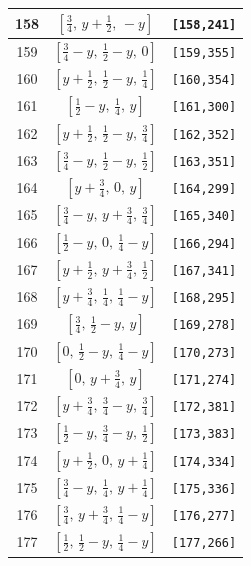 \documentclass[fleqn,8pt]{jsarticle}
\begin{document}
\begin{longtable}{ccc}
158 & $\left[ \frac{3}{4},\, y + \frac{1}{2},\, - y \right]$ & {\tt [158,241]} \\ \hline
159 & $\left[ \frac{3}{4} - y,\, \frac{1}{2} - y,\, 0 \right]$ & {\tt [159,355]} \\ \hline
160 & $\left[ y + \frac{1}{2},\, \frac{1}{2} - y,\, \frac{1}{4} \right]$ & {\tt [160,354]} \\ \hline
161 & $\left[ \frac{1}{2} - y,\, \frac{1}{4},\, y \right]$ & {\tt [161,300]} \\ \hline
162 & $\left[ y + \frac{1}{2},\, \frac{1}{2} - y,\, \frac{3}{4} \right]$ & {\tt [162,352]} \\ \hline
163 & $\left[ \frac{3}{4} - y,\, \frac{1}{2} - y,\, \frac{1}{2} \right]$ & {\tt [163,351]} \\ \hline
164 & $\left[ y + \frac{3}{4},\, 0,\, y \right]$ & {\tt [164,299]} \\ \hline
165 & $\left[ \frac{3}{4} - y,\, y + \frac{3}{4},\, \frac{3}{4} \right]$ & {\tt [165,340]} \\ \hline
166 & $\left[ \frac{1}{2} - y,\, 0,\, \frac{1}{4} - y \right]$ & {\tt [166,294]} \\ \hline
167 & $\left[ y + \frac{1}{2},\, y + \frac{3}{4},\, \frac{1}{2} \right]$ & {\tt [167,341]} \\ \hline
168 & $\left[ y + \frac{3}{4},\, \frac{1}{4},\, \frac{1}{4} - y \right]$ & {\tt [168,295]} \\ \hline
169 & $\left[ \frac{3}{4},\, \frac{1}{2} - y,\, y \right]$ & {\tt [169,278]} \\ \hline
170 & $\left[ 0,\, \frac{1}{2} - y,\, \frac{1}{4} - y \right]$ & {\tt [170,273]} \\ \hline
171 & $\left[ 0,\, y + \frac{3}{4},\, y \right]$ & {\tt [171,274]} \\ \hline
172 & $\left[ y + \frac{3}{4},\, \frac{3}{4} - y,\, \frac{3}{4} \right]$ & {\tt [172,381]} \\ \hline
173 & $\left[ \frac{1}{2} - y,\, \frac{3}{4} - y,\, \frac{1}{2} \right]$ & {\tt [173,383]} \\ \hline
174 & $\left[ y + \frac{1}{2},\, 0,\, y + \frac{1}{4} \right]$ & {\tt [174,334]} \\ \hline
175 & $\left[ \frac{3}{4} - y,\, \frac{1}{4},\, y + \frac{1}{4} \right]$ & {\tt [175,336]} \\ \hline
176 & $\left[ \frac{3}{4},\, y + \frac{3}{4},\, \frac{1}{4} - y \right]$ & {\tt [176,277]} \\ \hline
177 & $\left[ \frac{1}{2},\, \frac{1}{2} - y,\, \frac{1}{4} - y \right]$ & {\tt [177,266]} \\ \hline

\end{longtable}
\end{document}
